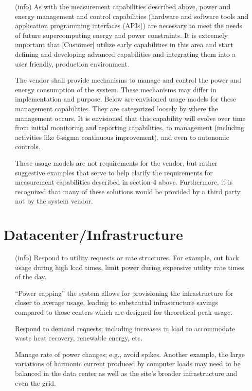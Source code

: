 \begin{itemize}
\item[(info)]
As with the measurement capabilities described above, power and energy management and control capabilities (hardware and software tools and application programming interfaces (APIs)) are necessary to meet the needs of future supercomputing energy and power constraints. It is extremely important that [Customer] utilize early capabilities in this area and start defining and developing advanced capabilities and integrating them into a user friendly, production environment.  

	The vendor shall provide mechanisms to manage and control the power and energy consumption of the system. These mechanisms may differ in implementation and purpose.  Below are envisioned usage models for these management capabilities.  They are categorized loosely by where the management occurs. It is envisioned that this capability will evolve over time from initial monitoring and reporting capabilities, to management (including activities like 6-sigma continuous improvement), and even to autonomic controls.   

	These usage models are not requirements for the vendor, but rather suggestive examples that serve to help clarify the requirements for measurement capabilities described in section 4 above. Furthermore, it is recognized that many of these solutions would be provided by a third party, not by the system vendor.  
\end{itemize}

\section{Datacenter/Infrastructure}
\begin{itemize}
\item[(info)]
Respond to utility requests or rate structures. For example, cut back usage during high load times, limit power during expensive utility rate times of the day. 

 ``Power capping'' the system allows for provisioning the infrastructure for closer to average usage, leading to substantial infrastructure savings compared to those centers which are designed for theoretical peak usage.  

Respond to demand requests; including increases in load to accommodate waste heat recovery, renewable energy, etc.

Manage rate of power changes; e.g., avoid spikes.  Another example, the large variations of harmonic current produced by computer loads may need to be balanced in the data center as well as the site’s broader infrastructure and even the grid.  
\end{itemize}

